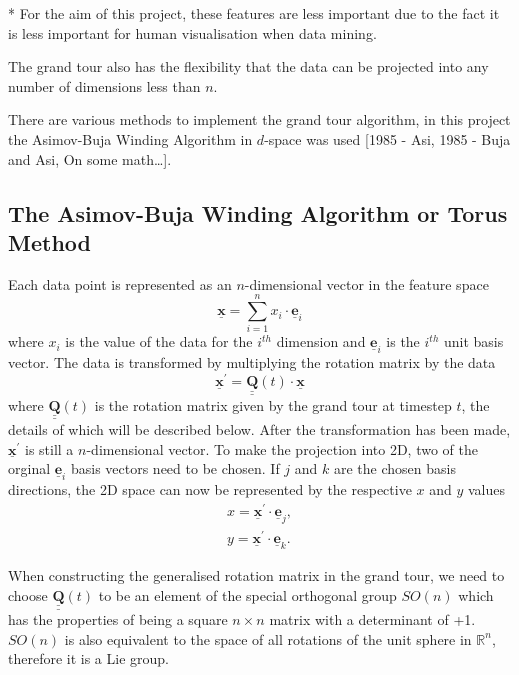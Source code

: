 \documentclass[a4paper,11pt,twoside]{article}
\def\doubleunderline#1{\underline{\underline{#1}}}
\begin{document}
* For the aim of this project, these features are less important due to the fact it is less important for human visualisation when data mining.
\newline

The grand tour also has the flexibility that the data can be projected into any number of dimensions less than $n$.
\newline

There are various methods to implement the grand tour algorithm, in this project the Asimov-Buja Winding Algorithm in $d$-space was used [1985 - Asi, 1985 - Buja and Asi, On some math…]. 

\subsection{The Asimov-Buja Winding Algorithm or Torus Method}

Each data point is represented as an $n$-dimensional vector in the feature space
\begin{equation}
\bm{\underline{x}}=\sum_{i=1}^n x_i\cdot\bm{\underline{e}}_i 
\end{equation}
where $x_i$ is the value of the data for the $i^{th}$ dimension and $\bm{\underline{e}}_i$ is the $i^{th}$ unit basis vector. The data is transformed by multiplying the rotation matrix by the data
\begin{equation}
\bm{\underline{x}}^\prime = \bm{\doubleunderline{Q}}(t)\cdot\bm{\underline{x}}
\end{equation}
where $\bm{\doubleunderline{Q}}(t)$ is the rotation matrix given by the grand tour at timestep $t$, the details of which will be described below. After the transformation has been made, $\bm{\underline{x}}^\prime$ is still a $n$-dimensional vector. To make the projection into 2D, two of the orginal $\bm{\underline{e}}_i$ basis vectors need to be chosen. If $j$ and $k$ are the chosen basis directions, the 2D space can now be represented by the respective $x$ and $y$ values
\begin{equation}
\begin{split}
x=\bm{\underline{x}}^\prime\cdot\bm{\underline{e}}_j, 
\\
y=\bm{\underline{x}}^\prime\cdot\bm{\underline{e}}_k.
\end{split}
\end{equation}

When constructing the generalised rotation matrix in the grand tour, we need to choose $\bm{\doubleunderline{Q}}(t)$ to be an element of the special orthogonal group $SO(n)$ which has the properties of being a square $n\times n$ matrix with a determinant of +1. $SO(n)$ is also equivalent to the space of all rotations of the unit sphere in $\mathbb{R}^n$, therefore it is a Lie group.
\newline
\end{document}
